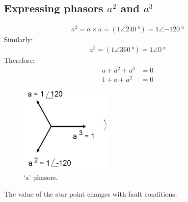 \subsection{Expressing phasors $a^2$ and $a^3$}
\begin{gather}
	a^2 = a \times a = \left(1 \angle \SI{240}{\degree}\right) = 1 \angle \SI{-120}{\degree}
\end{gather}
Similarly:
\begin{gather}
	a^3 = \left( 1 \angle \SI{360}{\degree}\right) = 1 \angle \SI{0}{\degree}
\end{gather}
Therefore:
\begin{align}
	a + a^2 + a^3 & = 0 \\
	1 + a + a^2   & = 0
\end{align}
\begin{figure}[H]
	\centering
	\includegraphics[width = 0.4\textwidth]{./img/figure28.png}
	\caption{`a' phasors.}
\end{figure}
The value of the star point changes with fault conditions.
